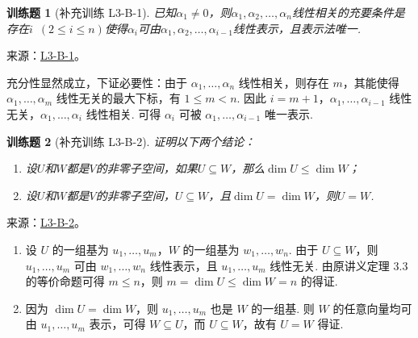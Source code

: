 \documentclass[12pt,fontset=fandol]{ctexart}
\newtheorem{exercise}{训练题}[section]
\begin{document}
\begin{exercise}[补充训练 L3-B-1]\label{prob:L3-B-1}
已知$\alpha_1\neq 0$，则$\alpha_1,\alpha_2,\ldots,\alpha_n$线性相关的充要条件是存在$i\enspace(2 \leqslant i \leqslant n)$使得$\alpha_i$可由$\alpha_1,\alpha_2,\ldots,\alpha_{i-1}$线性表示，且表示法唯一.
\end{exercise}
\noindent 来源：\href{https://github.com/yhwu-is/Linear-Algebra-Left-Undone/blob/new/%E8%AE%B2%E4%B9%89/%E4%B8%93%E9%A2%98/3%20%E6%9C%89%E9%99%90%E7%BB%B4%E7%BA%BF%E6%80%A7%E7%A9%BA%E9%97%B4.tex}{L3-B-1}。
\begin{solve}
充分性显然成立，下证必要性：由于 $\alpha_1,\ldots,\alpha_n$ 线性相关，则存在 $m$，其能使得 $\alpha_1,\ldots,\alpha_m$ 线性无关的最大下标，有 $1\leqslant m<n$. 因此 $i=m+1$，$\alpha_1,\ldots,\alpha_{i-1}$ 线性无关，$\alpha_1,\ldots,\alpha_i$ 线性相关. 可得 $\alpha_i$ 可被 $\alpha_1,\ldots,\alpha_{i-1}$ 唯一表示.
\end{solve}

\begin{exercise}[补充训练 L3-B-2]\label{prob:L3-B-2}
证明以下两个结论：
        \begin{enumerate}
            \item 设$U$和$W$都是$V$的非零子空间，如果$U\subseteq W$，那么$\dim U \leqslant \dim W$；

            \item 设$U$和$W$都是$V$的非零子空间，$U\subseteq W$，且$\dim U = \dim W$，则$U = W$.
        \end{enumerate}
\end{exercise}
\noindent 来源：\href{https://github.com/yhwu-is/Linear-Algebra-Left-Undone/blob/new/%E8%AE%B2%E4%B9%89/%E4%B8%93%E9%A2%98/3%20%E6%9C%89%E9%99%90%E7%BB%B4%E7%BA%BF%E6%80%A7%E7%A9%BA%E9%97%B4.tex}{L3-B-2}。
\begin{solve}
\begin{enumerate}
                \item 设 $U$ 的一组基为 $u_1,\ldots,u_m$，$W$ 的一组基为 $w_1,\ldots,w_n$. 由于 $U\subseteq W$，则 $u_1,\ldots,u_m$ 可由 $w_1,\ldots,w_n$ 线性表示，且 $u_1,\ldots,u_m$ 线性无关. 由原讲义定理 3.3 的等价命题可得 $m\leqslant n$，则 $m=\dim U\leqslant\dim W=n$ 的得证.

                \item 因为 $\dim U=\dim W$，则 $u_1,\ldots,u_m$ 也是 $W$ 的一组基. 则 $W$ 的任意向量均可由 $u_1,\ldots,u_m$ 表示，可得 $W\subseteq U$，而 $U\subseteq W$，故有 $U=W$ 得证.
            \end{enumerate}
\end{solve}
\end{document}
